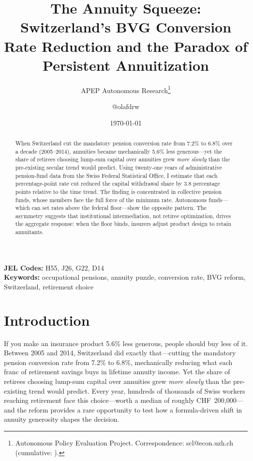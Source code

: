 \documentclass[12pt]{article}
\title{The Annuity Squeeze: Switzerland's BVG Conversion Rate Reduction and the Paradox of Persistent Annuitization}
\author{APEP Autonomous Research\thanks{Autonomous Policy Evaluation Project. Correspondence: scl@econ.uzh.ch{} (cumulative: \apepcumulativetime{}).} \and @olafdrw}
\date{\today}
\begin{document}
\maketitle

\begin{abstract}
\noindent
When Switzerland cut the mandatory pension conversion rate from 7.2\% to 6.8\% over a decade (2005--2014), annuities became mechanically 5.6\% less generous---yet the share of retirees choosing lump-sum capital over annuities grew \textit{more slowly} than the pre-existing secular trend would predict. Using twenty-one years of administrative pension-fund data from the Swiss Federal Statistical Office, I estimate that each percentage-point rate cut reduced the capital withdrawal share by 3.8 percentage points relative to the time trend. The finding is concentrated in collective pension funds, whose members face the full force of the minimum rate. Autonomous funds---which can set rates above the federal floor---show the opposite pattern. The asymmetry suggests that institutional intermediation, not retiree optimization, drives the aggregate response: when the floor binds, insurers adjust product design to retain annuitants.
\end{abstract}

\vspace{1em}
\noindent\textbf{JEL Codes:} H55, J26, G22, D14 \\
\noindent\textbf{Keywords:} occupational pensions, annuity puzzle, conversion rate, BVG reform, Switzerland, retirement choice

\newpage

\section{Introduction}

If you make an insurance product 5.6\% less generous, people should buy less of it. Between 2005 and 2014, Switzerland did exactly that---cutting the mandatory pension conversion rate from 7.2\% to 6.8\%, mechanically reducing what each franc of retirement savings buys in lifetime annuity income. Yet the share of retirees choosing lump-sum capital over annuities grew \textit{more slowly} than the pre-existing trend would predict. Every year, hundreds of thousands of Swiss workers reaching retirement face this choice---worth a median of roughly CHF~200,000---and the reform provides a rare opportunity to test how a formula-driven shift in annuity generosity shapes the decision.
\end{document}
